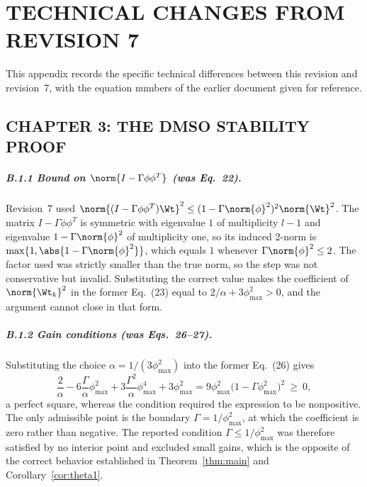 \chapter{TECHNICAL CHANGES FROM REVISION 7}
\label{app:errata}

This appendix records the specific technical differences between this revision
and revision~7, with the equation numbers of the earlier document given for
reference.

\section{CHAPTER 3: THE DMSO STABILITY PROOF}

\paragraph{B.1.1 Bound on $\norm{I-\Gamma\phi\phi^T}$ (was Eq.~22).}
Revision~7 used
$\norm{(I-\Gamma\phi\phi^T)\Wt}^2\le(1-\Gamma\norm{\phi}^2)^2\norm{\Wt}^2$. The
matrix $I-\Gamma\phi\phi^T$ is symmetric with eigenvalue $1$ of multiplicity
$l-1$ and eigenvalue $1-\Gamma\norm{\phi}^2$ of multiplicity one, so its induced
$2$-norm is $\max\{1,\abs{1-\Gamma\norm{\phi}^2}\}$, which equals $1$ whenever
$\Gamma\norm{\phi}^2\le2$. The factor used was strictly smaller than the true
norm, so the step was not conservative but invalid. Substituting the correct
value makes the coefficient of $\norm{\Wt_k}^2$ in the former Eq.~(23) equal to
$2/\alpha+3\phi_{\max}^2>0$, and the argument cannot close in that form.

\paragraph{B.1.2 Gain conditions (was Eqs.~26--27).}
Substituting the choice $\alpha=1/(3\phi_{\max}^2)$ into the former Eq.~(26)
gives
\begin{equation}\label{eq:persq}
\frac{2}{\alpha}-6\frac{\Gamma}{\alpha}\phi_{\max}^2
+3\frac{\Gamma^2}{\alpha}\phi_{\max}^4+3\phi_{\max}^2
=9\phi_{\max}^2\bigl(1-\Gamma\phi_{\max}^2\bigr)^2\ \ge\ 0 ,
\end{equation}
a perfect square, whereas the condition required the expression to be
nonpositive. The only admissible point is the boundary
$\Gamma=1/\phi_{\max}^2$, at which the coefficient is zero rather than negative.
The reported condition $\Gamma\le1/\phi_{\max}^2$ was therefore satisfied by no
interior point and excluded small gains, which is the opposite of the correct
behavior established in Theorem~\ref{thm:main} and Corollary~\ref{cor:theta1}.

